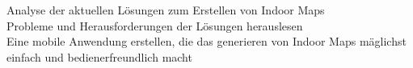 \section{
}
Analyse der aktuellen Lösungen zum Erstellen von Indoor Maps\\
Probleme und Herausforderungen der Lösungen herauslesen\\
Eine mobile Anwendung erstellen, die das generieren von Indoor Maps mäglichst einfach und bedienerfreundlich macht\\
